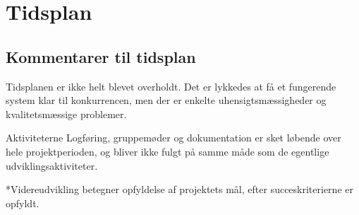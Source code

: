 \section{Tidsplan}

\clearpage
\subsection{Kommentarer til tidsplan}
Tidsplanen er ikke helt blevet overholdt. Det er lykkedes at få et fungerende system klar til konkurrencen, men der er enkelte uhensigtsmæssigheder og kvalitetsmæssige problemer.

Aktiviteterne Logføring, gruppemøder og dokumentation er sket løbende over hele projektperioden, og bliver ikke fulgt på samme måde som de egentlige udviklingsaktiviteter.

*Videreudvikling betegner opfyldelse af projektets mål, efter succeskriterierne er opfyldt.